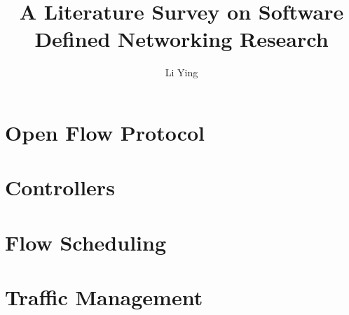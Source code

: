 \documentclass[a4paper,11pt]{article}
\author{Li Ying}
\title{A Literature Survey on Software Defined Networking Research}
\begin{document}
\maketitle
\tableofcontents

\section{Open Flow Protocol}
\section{Controllers}
\section{Flow Scheduling}
\section{Traffic Management}

\nocite{*}

\end{document}
